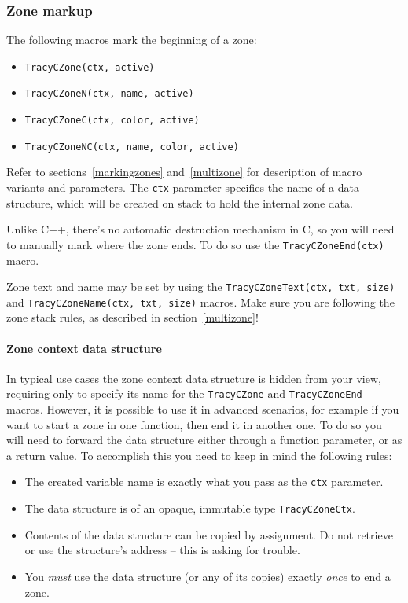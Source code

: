 \documentclass[hidelinks,titlepage,a4paper]{article}
\begin{document}
\subsubsection{Zone markup}
\label{czonemarkup}

The following macros mark the beginning of a zone:

\begin{itemize}
\item \texttt{TracyCZone(ctx, active)}
\item \texttt{TracyCZoneN(ctx, name, active)}
\item \texttt{TracyCZoneC(ctx, color, active)}
\item \texttt{TracyCZoneNC(ctx, name, color, active)}
\end{itemize}

Refer to sections~\ref{markingzones} and~\ref{multizone} for description of macro variants and parameters. The \texttt{ctx} parameter specifies the name of a data structure, which will be created on stack to hold the internal zone data.

Unlike C++, there's no automatic destruction mechanism in C, so you will need to manually mark where the zone ends. To do so use the \texttt{TracyCZoneEnd(ctx)} macro.

Zone text and name may be set by using the \texttt{TracyCZoneText(ctx, txt, size)} and \texttt{TracyCZoneName(ctx, txt, size)} macros. Make sure you are following the zone stack rules, as described in section~\ref{multizone}!

\paragraph{Zone context data structure}
\label{zonectx}

In typical use cases the zone context data structure is hidden from your view, requiring only to specify its name for the \texttt{TracyCZone} and \texttt{TracyCZoneEnd} macros. However, it is possible to use it in advanced scenarios, for example if you want to start a zone in one function, then end it in another one. To do so you will need to forward the data structure either through a function parameter, or as a return value. To accomplish this you need to keep in mind the following rules:

\begin{itemize}
\item The created variable name is exactly what you pass as the \texttt{ctx} parameter.
\item The data structure is of an opaque, immutable type \texttt{TracyCZoneCtx}.
\item Contents of the data structure can be copied by assignment. Do not retrieve or use the structure's address -- this is asking for trouble.
\item You \emph{must} use the data structure (or any of its copies) exactly \emph{once} to end a zone.
\end{itemize}
\end{document}
